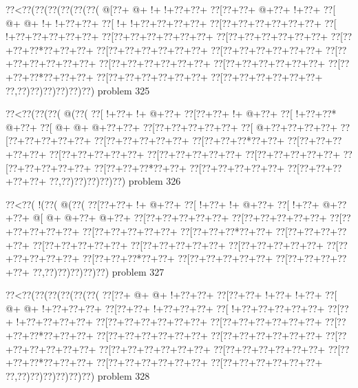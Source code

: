 \vbox{\vbox{\goo
\0??<\0??(\0??(\0??(\0??(\0??(\0??(
\- @[\0??+\- @+\- !+\- !+\0??+\0??+
\0??[\0??+\0??+\- @+\0??+\- !+\0??+
\0??[\- @+\- @+\- !+\- !+\0??+\0??+
\0??[\- !+\- !+\0??+\0??+\0??+\0??+
\0??[\0??+\0??+\0??+\0??+\0??+\0??+
\0??[\- !+\0??+\0??+\0??+\0??+\0??+
\0??[\0??+\0??+\0??+\0??+\0??+\0??+
\0??[\0??+\0??+\0??+\0??+\0??+\0??+
\0??[\0??+\0??+\0??*\0??+\0??+\0??+
\0??[\0??+\0??+\0??+\0??+\0??+\0??+
\0??[\0??+\0??+\0??+\0??+\0??+\0??+
\0??[\0??+\0??+\0??+\0??+\0??+\0??+
\0??[\0??+\0??+\0??+\0??+\0??+\0??+
\0??[\0??+\0??+\0??+\0??+\0??+\0??+
\0??[\0??+\0??+\0??*\0??+\0??+\0??+
\0??[\0??+\0??+\0??+\0??+\0??+\0??+
\0??[\0??+\0??+\0??+\0??+\0??+\0??+
\0??,\0??)\0??)\0??)\0??)\0??)\0??)
}
\hfil problem 325\hfil\break
}

\vbox{\vbox{\goo
\0??<\0??(\0??(\0??(\- @(\0??(
\0??[\- !+\0??+\- !+\- @+\0??+
\0??[\0??+\0??+\- !+\- @+\0??+
\0??[\- !+\0??+\0??*\- @+\0??+
\0??[\- @+\- @+\- @+\0??+\0??+
\0??[\0??+\0??+\0??+\0??+\0??+
\0??[\- @+\0??+\0??+\0??+\0??+
\0??[\0??+\0??+\0??+\0??+\0??+
\0??[\0??+\0??+\0??+\0??+\0??+
\0??[\0??+\0??+\0??*\0??+\0??+
\0??[\0??+\0??+\0??+\0??+\0??+
\0??[\0??+\0??+\0??+\0??+\0??+
\0??[\0??+\0??+\0??+\0??+\0??+
\0??[\0??+\0??+\0??+\0??+\0??+
\0??[\0??+\0??+\0??+\0??+\0??+
\0??[\0??+\0??+\0??*\0??+\0??+
\0??[\0??+\0??+\0??+\0??+\0??+
\0??[\0??+\0??+\0??+\0??+\0??+
\0??,\0??)\0??)\0??)\0??)\0??)
}
\hfil problem 326\hfil\break
}

\vbox{\vbox{\goo
\0??<\0??(\- !(\0??(\- @(\0??(
\0??[\0??+\0??+\- !+\- @+\0??+
\0??[\- !+\0??+\- !+\- @+\0??+
\0??[\- !+\0??+\- @+\0??+\0??+
\- @[\- @+\- @+\0??+\- @+\0??+
\0??[\0??+\0??+\0??+\0??+\0??+
\0??[\0??+\0??+\0??+\0??+\0??+
\0??[\0??+\0??+\0??+\0??+\0??+
\0??[\0??+\0??+\0??+\0??+\0??+
\0??[\0??+\0??+\0??*\0??+\0??+
\0??[\0??+\0??+\0??+\0??+\0??+
\0??[\0??+\0??+\0??+\0??+\0??+
\0??[\0??+\0??+\0??+\0??+\0??+
\0??[\0??+\0??+\0??+\0??+\0??+
\0??[\0??+\0??+\0??+\0??+\0??+
\0??[\0??+\0??+\0??*\0??+\0??+
\0??[\0??+\0??+\0??+\0??+\0??+
\0??[\0??+\0??+\0??+\0??+\0??+
\0??,\0??)\0??)\0??)\0??)\0??)
}
\hfil problem 327\hfil\break
}

\vbox{\vbox{\goo
\0??<\0??(\0??(\0??(\0??(\0??(\0??(
\0??[\0??+\- @+\- @+\- !+\0??+\0??+
\0??[\0??+\0??+\- !+\0??+\- !+\0??+
\0??[\- @+\- @+\- !+\0??+\0??+\0??+
\0??[\0??+\0??+\- !+\0??+\0??+\0??+
\0??[\- !+\0??+\0??+\0??+\0??+\0??+
\0??[\0??+\- !+\0??+\0??+\0??+\0??+
\0??[\0??+\0??+\0??+\0??+\0??+\0??+
\0??[\0??+\0??+\0??+\0??+\0??+\0??+
\0??[\0??+\0??+\0??*\0??+\0??+\0??+
\0??[\0??+\0??+\0??+\0??+\0??+\0??+
\0??[\0??+\0??+\0??+\0??+\0??+\0??+
\0??[\0??+\0??+\0??+\0??+\0??+\0??+
\0??[\0??+\0??+\0??+\0??+\0??+\0??+
\0??[\0??+\0??+\0??+\0??+\0??+\0??+
\0??[\0??+\0??+\0??*\0??+\0??+\0??+
\0??[\0??+\0??+\0??+\0??+\0??+\0??+
\0??[\0??+\0??+\0??+\0??+\0??+\0??+
\0??,\0??)\0??)\0??)\0??)\0??)\0??)
}
\hfil problem 328\hfil\break
}

